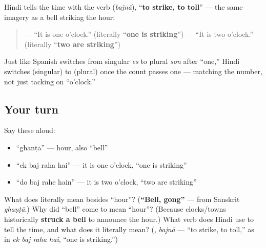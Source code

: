 \begin{grammarlens}[title={Grammar Lens: \hi{बजना} — \textquotedblleft{}to strike, to toll\textquotedblright{}}]
Hindi tells the time with the verb \textbf{} (\emph{bajnā}), \textquotedblleft{}\textbf{to strike, to toll}\textquotedblright{} — the same imagery as a bell striking the hour:

\begin{quote}
\textbf{   } — \textquotedblleft{}It is one o'clock.\textquotedblright{} (literally \textquotedblleft{}\textbf{one is striking}\textquotedblright{}) \textbf{   } — \textquotedblleft{}It is two o'clock.\textquotedblright{} (literally \textquotedblleft{}\textbf{two are striking}\textquotedblright{})
\end{quote}

Just like Spanish switches from singular \emph{es} to plural \emph{son} after \textquotedblleft{}one,\textquotedblright{} Hindi switches \textbf{  } (singular) to \textbf{  } (plural) once the count passes one — matching the number, not just tacking on \textquotedblleft{}o'clock.\textquotedblright{}
\end{grammarlens}

\subsection*{Your turn}
Say these aloud:

\begin{itemize}
\raggedright
  \item \textquotedblleft{}ghanṭā\textquotedblright{} — hour, also \textquotedblleft{}bell\textquotedblright{}
  \item \textquotedblleft{}ek baj raha hai\textquotedblright{} — it is one o'clock, \textquotedblleft{}one is striking\textquotedblright{}
  \item \textquotedblleft{}do baj rahe hain\textquotedblright{} — it is two o'clock, \textquotedblleft{}two are striking\textquotedblright{}
\end{itemize}

\begin{tcolorbox}[breakable,colback=teal!4,colframe=teal!35!black,title={Before you move on}]
What does \textbf{} literally mean besides \textquotedblleft{}hour\textquotedblright{}? (\textbf{\textquotedblleft{}Bell, gong\textquotedblright{}} — from Sanskrit \emph{ghaṇṭā}.) Why did \textquotedblleft{}bell\textquotedblright{} come to mean \textquotedblleft{}hour\textquotedblright{}? (Because clocks/towns historically \textbf{struck a bell} to announce the hour.) What verb does Hindi use to tell the time, and what does it literally mean? (\textbf{}, \emph{bajnā} — \textquotedblleft{}to strike, to toll,\textquotedblright{} as in \emph{ek baj raha hai}, \textquotedblleft{}one is striking.\textquotedblright{})
\end{tcolorbox}
